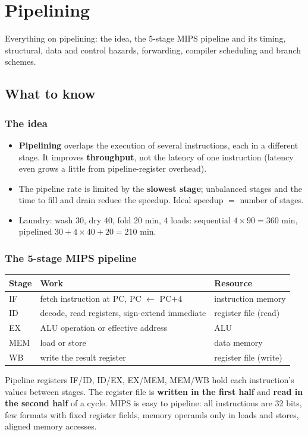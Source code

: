 \section{Pipelining}
\label{sec:pipe}

Everything on pipelining: the idea, the 5-stage MIPS pipeline and its timing,
structural, data and control hazards, forwarding, compiler scheduling and branch
schemes.

\subsection{What to know}

\subsubsection{The idea}
\begin{itemize}[leftmargin=*]
  \item \textbf{Pipelining} overlaps the execution of several instructions, each in
  a different stage. It improves \textbf{throughput}, not the latency of one
  instruction (latency even grows a little from pipeline-register overhead).
  \item The pipeline rate is limited by the \textbf{slowest stage}; unbalanced
  stages and the time to fill and drain reduce the speedup. Ideal speedup $=$
  number of stages.
  \item Laundry: wash 30, dry 40, fold 20 min, 4 loads: sequential
  $4\times90=360$ min, pipelined $30+4\times40+20=210$ min.
\end{itemize}

\subsubsection{The 5-stage MIPS pipeline}
\begin{center}
\small
\begin{tabular}{@{}lll@{}}
\toprule
Stage & Work & Resource \\
\midrule
IF & fetch instruction at PC, PC $\leftarrow$ PC$+4$ & instruction memory \\
ID & decode, read registers, sign-extend immediate & register file (read) \\
EX & ALU operation or effective address & ALU \\
MEM & load or store & data memory \\
WB & write the result register & register file (write) \\
\bottomrule
\end{tabular}
\end{center}
Pipeline registers IF/ID, ID/EX, EX/MEM, MEM/WB hold each instruction's values
between stages. The register file is \textbf{written in the first half} and
\textbf{read in the second half} of a cycle. MIPS is easy to pipeline: all
instructions are 32 bits, few formats with fixed register fields, memory operands
only in loads and stores, aligned memory accesses.

